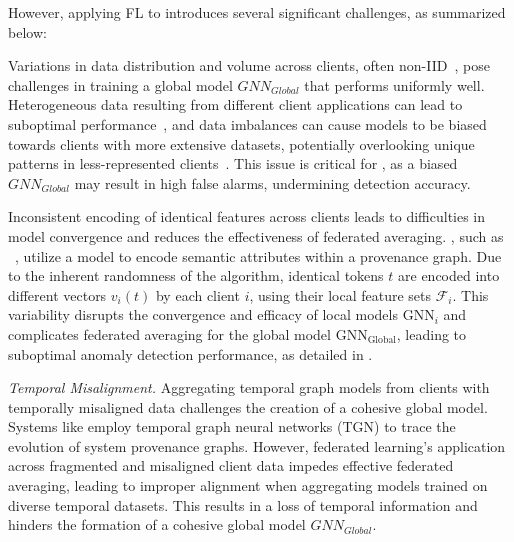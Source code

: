However, applying FL to \pids introduces several significant challenges, as summarized below:

\begin{enumerate}[itemsep=0.1em, parsep=0em, topsep=0em, leftmargin=*]
   Variations in data distribution and volume across clients, often non-IID~\cite{zhao2018federated}, pose challenges in training a global model \( GNN_{Global} \) that performs uniformly well. Heterogeneous data resulting from different client applications can lead to suboptimal performance~\cite{qu2022rethinking}, and data imbalances can cause models to be biased towards clients with more extensive datasets, potentially overlooking unique patterns in less-represented clients~\cite{duan2020self}. This issue is critical for \pids, as a biased \( GNN_{Global} \) may result in high false alarms, undermining detection accuracy.

   Inconsistent encoding of identical features across clients leads to difficulties in model convergence and reduces the effectiveness of federated averaging. \pids, such as \flash~\cite{cheng2023kairos}, utilize a \wordvec model to encode semantic attributes within a provenance graph. Due to the inherent randomness of the \wordvec algorithm, identical tokens \( t \) are encoded into different vectors \( v_i(t) \) by each client \( i \), using their local feature sets \( \mathcal{F}_i \). This variability disrupts the convergence and efficacy of local \gnn models \( \text{GNN}_{i} \) and complicates federated averaging for the global \gnn model \( \text{GNN}_{\text{Global}} \), leading to suboptimal anomaly detection performance, as detailed in \cite{zhou2023fedfa}.

   {\it Temporal Misalignment.} Aggregating temporal graph models from clients with temporally misaligned data challenges the creation of a cohesive global model. Systems like \kairos \cite{cheng2023kairos} employ temporal graph neural networks (TGN) to trace the evolution of system provenance graphs. However, federated learning's application across fragmented and misaligned client data impedes effective federated averaging, leading to improper alignment when aggregating models trained on diverse temporal datasets. This results in a loss of temporal information and hinders the formation of a cohesive global model \( GNN_{Global} \).
  
\end{enumerate}


